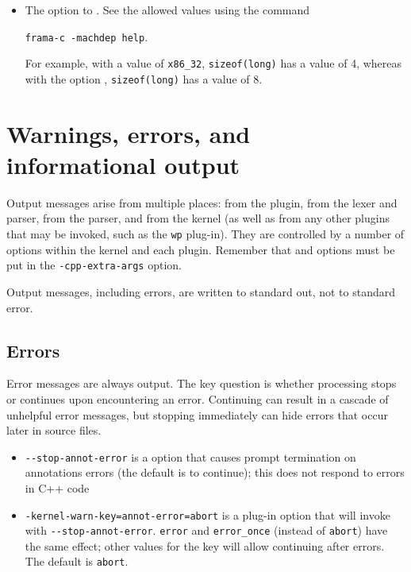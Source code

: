 \begin{itemize}
\item The  option to \framac. See the allowed values using the command\\
\centerline{ \lstinline|frama-c -machdep help|.}
 For example, with a value of \lstinline|x86_32|, \lstinline|sizeof(long)| has a value of 4, whereas with the option , \lstinline|sizeof(long)| has a value of 8.

\end{itemize}


\section{Warnings, errors, and informational output}

Output messages arise from multiple places: from the \fcl plugin, from the \irg lexer and parser, from the \clang parser, and from the \framac kernel (as well as from any other plugins that may be invoked, such as the \texttt{wp} plug-in). 
They are controlled by a number of options within the \framac kernel and each plugin. Remember that \cl and \irg options must be put in the \lstinline|-cpp-extra-args| option.

Output messages, including errors, are written to standard out, not to standard error. 

\subsection{Errors}

Error messages are always output. 
The key question is whether processing stops or continues upon encountering an error. 
Continuing can result in a cascade of unhelpful error messages, but stopping immediately can hide errors that occur later in source files.
\begin{itemize}
\item \lstinline|--stop-annot-error| is a \irg option that causes prompt termination on annotations errors (the \irg default is to continue); this does not respond to errors in C++ code
\item \lstinline|-kernel-warn-key=annot-error=abort| is a \fcl plug-in option that will invoke \irg with \lstinline|--stop-annot-error|.  \lstinline|error| and \lstinline|error_once| (instead of \lstinline|abort|) have the same effect; other values for the key will allow continuing after errors. The default is \texttt{abort}.
\end{itemize}


